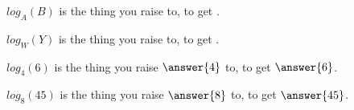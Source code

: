 \documentclass{ximera}
\author{Lee Wayand}
\begin{document}
\begin{exercise}







\begin{question}


$log_A(B)$ is the thing you raise   to, to get .


\end{question}








\begin{question}


$log_W(Y)$ is the thing you raise   to, to get .


\end{question}






\begin{question}


$log_4(6)$ is the thing you raise $\answer{4}$ to, to get $\answer{6}$.


\end{question}






\begin{question}


$log_8(45)$ is the thing you raise $\answer{8}$ to, to get $\answer{45}$.


\end{question}










\end{exercise}
\end{document}
